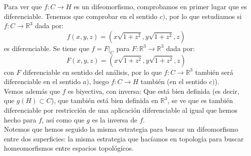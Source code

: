\begin{ejercicio}
    \noindent
    Para ver que $f:C\to H$ es un difeomorfismo, comprobamos en primer lugar que es diferenciable. Tenemos que comprobar en el sentido $c)$, por lo que estudiamos si $f:C\to \mathbb{R}^3$ dada por:
    \begin{equation*}
        f(x,y,z) = \left(x\sqrt{1+z^2}, y\sqrt{1+z^2},z\right)
    \end{equation*}
    es diferenciable. Se tiene que $f = F\big|_C$ para $F:\mathbb{R}^3\to \mathbb{R}^3$ dada por:
    \begin{equation*}
        F(x,y,z) = \left(x\sqrt{1+z^2}, y\sqrt{1+z^2},z\right)
    \end{equation*}
    con $F$ diferenciable en sentido del análisis, por lo que $f:C\to \mathbb{R}^3$ también será diferenciable en el sentido $a)$, luego $f:C\to H$ también (en el sentido $c)$).\\

    \noindent
    Vemos además que $f$ es biyectiva, con inversa:
    Que está bien definida (es decir, que $g(H)\subset C$), que también está bien definida en $\mathbb{R}^3$, se ve que es también diferenciable por restricción de una aplicación diferenciable al igual que hemos hecho para $f$, así como que $g$ es la inversa de $f$.\\

    \noindent
    Notemos que hemos seguido la misma estrategia para buscar un difeomorfismo entre dos superficies: la misma estrategia que hacíamos en topología para buscar homeomorfismos entre espacios topológicos.
\end{ejercicio}

